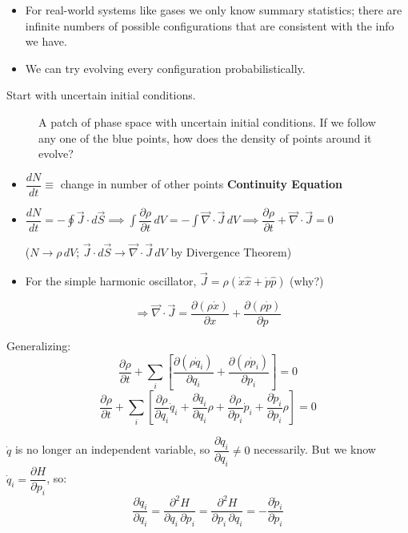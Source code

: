\begin{itemize}
    \item For real-world systems like gases we only know summary statistics; there are infinite numbers of possible configurations that are consistent with the info we have.
    \item We can try evolving every configuration probabilistically.
\end{itemize}

Start with uncertain initial conditions.

\begin{figure}[H]
    \centering
    \caption{A patch of phase space with uncertain initial conditions. If we follow any one of the blue points, how does the density of points around it evolve?}
\end{figure}

\begin{itemize}
    \item $\dfrac{dN}{dt} \equiv$ change in number of other points \hfill \textbf{Continuity Equation}
    \item $\dfrac{dN}{dt} = -\oint \vec{J}\cdot d\vec{S} \implies \int\dfrac{\partial\rho}{\partial t}\,dV = -\int\vec{\nabla}\cdot\vec{J}\,dV \implies \dfrac{\partial\rho}{\partial t} + \vec{\nabla}\cdot\vec{J} = 0$

    ($N \to \rho\,dV$; $\vec{J}\cdot d\vec{S} \to \vec{\nabla}\cdot\vec{J}\,dV$ by Divergence Theorem)
    \item For the simple harmonic oscillator, $\vec{J} = \rho(\dot{x}\hat{x} + \dot{p}\hat{p})$ (why?)
\end{itemize}

\[
    \Rightarrow \vec{\nabla}\cdot\vec{J} = \frac{\partial(\rho\dot{x})}{\partial x} + \frac{\partial(\rho\dot{p})}{\partial p}
\]

Generalizing:
\[
    \frac{\partial\rho}{\partial t} + \sum_i\!\left[\frac{\partial(\rho\dot{q}_i)}{\partial q_i} + \frac{\partial(\rho\dot{p}_i)}{\partial p_i}\right] = 0
\]
\[
    \frac{\partial\rho}{\partial t} + \sum_i\!\left[\frac{\partial\rho}{\partial q_i}\dot{q}_i + \frac{\partial\dot{q}_i}{\partial q_i}\rho + \frac{\partial\rho}{\partial p_i}\dot{p}_i + \frac{\partial\dot{p}_i}{\partial p_i}\rho\right] = 0
\]

$\dot{q}$ is no longer an independent variable, so $\dfrac{\partial\dot{q}_i}{\partial q_i} \neq 0$ necessarily. But we know $\dot{q}_i = \dfrac{\partial H}{\partial p_i}$, so:
\[
    \frac{\partial\dot{q}_i}{\partial q_i} = \frac{\partial^2 H}{\partial q_i\,\partial p_i} = \frac{\partial^2 H}{\partial p_i\,\partial q_i} = -\frac{\partial\dot{p}_i}{\partial p_i}
\]

